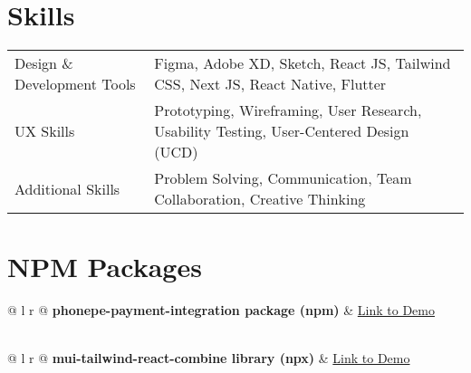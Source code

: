 \documentclass[a4paper,12pt]{article}
\begin{document}
\section{Skills}
\begin{tabularx}{\linewidth}{@{} l X @{}}
Design \& Development Tools & \normalsize{Figma, Adobe XD, Sketch, React JS, Tailwind CSS, Next JS, React Native, Flutter} \\
UX Skills & \normalsize{Prototyping, Wireframing, User Research, Usability Testing, User-Centered Design (UCD)} \\
Additional Skills & \normalsize{Problem Solving, Communication, Team Collaboration, Creative Thinking} \\
\end{tabularx}

\section{NPM Packages}
\begin{tabularx}{\linewidth}{@{} l r @{}}
\textbf{phonepe-payment-integration package (npm)} & \hfill \href{https://www.npmjs.com/package/phonepe-payment-integration}{Link to Demo} \\[3.75pt]
 \\
\end{tabularx}

\begin{tabularx}{\linewidth}{@{} l r @{}}
\textbf{mui-tailwind-react-combine library (npx)} & \hfill \href{https://www.npmjs.com/package/react-mui-tailwind_css_frontend}{Link to Demo} \\[3.75pt]
 \\
\end{tabularx}

\end{document}
